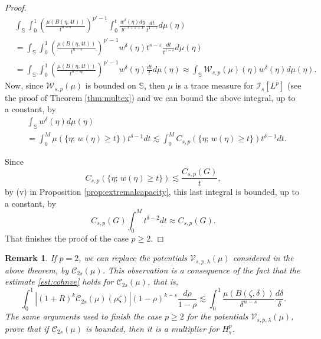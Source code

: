 \documentclass[12pt,twoside,leqno,final]{amsart}
\theoremstyle{plain}
\newtheorem{rem}[thm]{Remark}
\begin{document}
\begin{proof}
\begin{equation*}\begin{split}&
\int_{{\mathbb S}}\int_0^1 \left(\frac{\mu(B(\eta,4t))}{t^{n-s}} \right)^{p'-1}\int_0^t \frac{w^\delta( \eta) dy}{y^{ -s+\varepsilon+1}}\frac{dt}{t^{1-\varepsilon}}d\mu(\eta)\\&=
\int_{{\mathbb S}}\int_0^1 \left(\frac{\mu(B(\eta,4t))}{t^{n-s}} \right)^{p'-1} w^\delta( \eta ) t^{s-\varepsilon}\frac{dt}{t^{1-\varepsilon}}d\mu(\eta)\\&=
\int_{{\mathbb S}}\int_0^1 \left(\frac{\mu(B(\eta,4t))}{t^{n-sp}} \right)^{p'-1} w^\delta( \eta )  \frac{dt}{t}d\mu(\eta)\approx \int_{{\mathbb S}} {\mathcal W}_{s,p}(\mu) (\eta)w^\delta(\eta) d\mu(\eta).
\end{split}\end{equation*}
Now, since ${\mathcal W}_{s,p}(\mu) $ is bounded on ${{\mathbb S}}$,  then $\mu$ is a trace measure for ${\mathcal I}_s[L^p]$ (see the proof of Theorem \ref{thm:multex}) and we can bound the above integral, up to a constant, by
\begin{equation*}\begin{split}&
\int_{{\mathbb S}}  w^\delta(\eta) d\mu(\eta)\\&
=\int_0^M \mu(\{\eta;\, w(\eta)\geq t\}) t^{\delta-1}dt\lesssim  \int_0^M C_{s,p}(\{\eta;\, w(\eta)\geq t\}) t^{\delta-1}dt.
\end{split}\end{equation*}

Since
$$ C_{s,p}(\{\eta;\, w(\eta)\geq t\})\lesssim \frac{C_{s,p}(G)}{t},$$ 
by (v) in  Proposition  \ref{prop:extremalcapacity}, this last integral is bounded, up to a constant,
by $$C_{s,p}(G)\int_0^M t^{\delta-2}dt\approx C_{s,p}(G).$$
That finishes the proof of the case $p\geq 2$.
\end{proof}

\begin{rem}\label{rem:c2s}
If $p=2$, we can replace the potentials ${\mathcal V}_{s,p,\lambda}(\mu)$ considered in the above theorem, by ${\mathcal C}_{2s}(\mu)$.  This observation is a consequence of the fact  that the estimate \eqref{est:cohnve} holds for ${\mathcal C}_{2s}(\mu)$, that is,
$$\int_0^1 |(1+R)^k {\mathcal C}_{2s}(\mu)(\rho\zeta)|(1-\rho)^{k-s}\frac{d\rho}{1-\rho}\lesssim \int_0^1 \frac{\mu(B(\zeta,\delta))}{\delta^{n-s}}\frac{d\delta}{\delta}.$$
The same arguments used to finish the case $p\geq 2$ for the potentials ${\mathcal V}_{s,p,\lambda}(\mu)$, prove that if ${\mathcal C}_{2s}(\mu)$ is bounded, then it is a multiplier for $H_s^p$. 
\end{rem}
\end{document}

